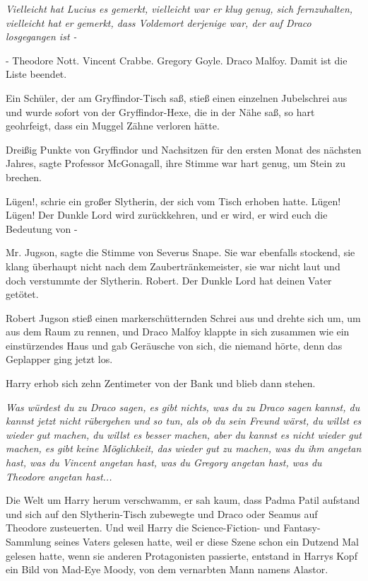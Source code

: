 \emph{Vielleicht hat Lucius es gemerkt, vielleicht war er klug genug, sich
fernzuhalten, vielleicht hat er gemerkt, dass Voldemort derjenige war, der auf
Draco losgegangen ist -}

\glqq{}- Theodore Nott. Vincent Crabbe. Gregory Goyle. Draco Malfoy. Damit ist
die Liste beendet.\grqq{}

Ein Schüler, der am Gryffindor-Tisch saß, stieß einen einzelnen Jubelschrei aus
und wurde sofort von der Gryffindor-Hexe, die in der Nähe saß, so hart
geohrfeigt, dass ein Muggel Zähne verloren hätte.

\glqq{}Dreißig Punkte von Gryffindor und Nachsitzen für den ersten Monat des
nächsten Jahres\grqq{}, sagte Professor McGonagall, ihre Stimme war hart genug,
um Stein zu brechen.

\glqq{}Lügen!\grqq{}, schrie ein großer Slytherin, der sich vom Tisch erhoben
hatte. \glqq{}Lügen! Lügen! Der Dunkle Lord wird zurückkehren, und er wird, er
wird euch die Bedeutung von -\grqq{}

\glqq{}Mr. Jugson\grqq{}, sagte die Stimme von Severus Snape. Sie war ebenfalls
stockend, sie klang überhaupt nicht nach dem Zaubertränkemeister, sie war nicht
laut und doch verstummte der Slytherin. \glqq{}Robert. Der Dunkle Lord hat deinen
Vater getötet.\grqq{}

Robert Jugson stieß einen markerschütternden Schrei aus und drehte sich um, um
aus dem Raum zu rennen, und Draco Malfoy klappte in sich zusammen wie ein
einstürzendes Haus und gab Geräusche von sich, die niemand hörte, denn das
Geplapper ging jetzt los.

Harry erhob sich zehn Zentimeter von der Bank und blieb dann stehen.

\emph{Was würdest du zu Draco sagen, es gibt nichts, was du zu Draco sagen
kannst, du kannst jetzt nicht rübergehen und so tun, als ob du sein Freund
wärst, du willst es wieder gut machen, du willst es besser machen, aber du
kannst es nicht wieder gut machen, es gibt keine Möglichkeit, das wieder gut zu
machen, was du ihm angetan hast, was du Vincent angetan hast, was du Gregory
angetan hast, was du Theodore angetan hast...}

Die Welt um Harry herum verschwamm, er sah kaum, dass Padma Patil aufstand und
sich auf den Slytherin-Tisch zubewegte und Draco oder Seamus auf Theodore
zusteuerten. Und weil Harry die Science-Fiction- und Fantasy-Sammlung seines
Vaters gelesen hatte, weil er diese Szene schon ein Dutzend Mal gelesen hatte,
wenn sie anderen Protagonisten passierte, entstand in Harrys Kopf ein Bild von
Mad-Eye Moody, von dem vernarbten Mann namens Alastor.

